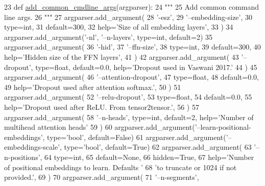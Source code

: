 \begin{DoxyCode}
23 \textcolor{keyword}{def }\hyperlink{namespaceparlai_1_1agents_1_1transformer_1_1transformer_a916bc49d43dc0e244d24c47956c621ca}{add\_common\_cmdline\_args}(argparser):
24     \textcolor{stringliteral}{"""}
25 \textcolor{stringliteral}{    Add common command line args.}
26 \textcolor{stringliteral}{    """}
27     argparser.add\_argument(
28         \textcolor{stringliteral}{'-esz'},
29         \textcolor{stringliteral}{'--embedding-size'},
30         type=int,
31         default=300,
32         help=\textcolor{stringliteral}{'Size of all embedding layers'},
33     )
34     argparser.add\_argument(\textcolor{stringliteral}{'-nl'}, \textcolor{stringliteral}{'--n-layers'}, type=int, default=2)
35     argparser.add\_argument(
36         \textcolor{stringliteral}{'-hid'},
37         \textcolor{stringliteral}{'--ffn-size'},
38         type=int,
39         default=300,
40         help=\textcolor{stringliteral}{'Hidden size of the FFN layers'},
41     )
42     argparser.add\_argument(
43         \textcolor{stringliteral}{'--dropout'}, type=float, default=0.0, help=\textcolor{stringliteral}{'Dropout used in Vaswani 2017.'}
44     )
45     argparser.add\_argument(
46         \textcolor{stringliteral}{'--attention-dropout'},
47         type=float,
48         default=0.0,
49         help=\textcolor{stringliteral}{'Dropout used after attention softmax.'},
50     )
51     argparser.add\_argument(
52         \textcolor{stringliteral}{'--relu-dropout'},
53         type=float,
54         default=0.0,
55         help=\textcolor{stringliteral}{'Dropout used after ReLU. From tensor2tensor.'},
56     )
57     argparser.add\_argument(
58         \textcolor{stringliteral}{'--n-heads'}, type=int, default=2, help=\textcolor{stringliteral}{'Number of multihead attention heads'}
59     )
60     argparser.add\_argument(\textcolor{stringliteral}{'--learn-positional-embeddings'}, type=\textcolor{stringliteral}{'bool'}, default=\textcolor{keyword}{False})
61     argparser.add\_argument(\textcolor{stringliteral}{'--embeddings-scale'}, type=\textcolor{stringliteral}{'bool'}, default=\textcolor{keyword}{True})
62     argparser.add\_argument(
63         \textcolor{stringliteral}{'--n-positions'},
64         type=int,
65         default=\textcolor{keywordtype}{None},
66         hidden=\textcolor{keyword}{True},
67         help=\textcolor{stringliteral}{'Number of positional embeddings to learn. Defaults '}
68         \textcolor{stringliteral}{'to truncate or 1024 if not provided.'},
69     )
70     argparser.add\_argument(
71         \textcolor{stringliteral}{'--n-segments'},

\end{DoxyCode}
